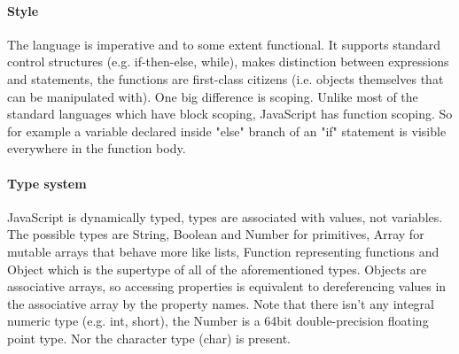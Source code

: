 \documentclass[12pt,a4paper]{report}
\begin{document}
\paragraph{Style} The language is imperative and to some extent functional. It supports standard control structures (e.g. if-then-else, while), makes distinction between expressions and statements, the functions are first-class citizens (i.e. objects themselves that can be manipulated with). One big difference is scoping. Unlike most of the standard languages which have block scoping, JavaScript has function scoping. So for example a variable declared inside "else" branch of an "if" statement is visible everywhere in the function body.

\paragraph{Type system} JavaScript is dynamically typed, types are associated with values, not variables. The possible types are String, Boolean and Number for primitives, Array for mutable arrays that behave more like lists, Function representing functions and Object which is the supertype of all of the aforementioned types. Objects are associative arrays, so accessing properties is equivalent to dereferencing values in the associative array by the property names. Note that there isn't any integral numeric type (e.g. int, short), the Number is a 64bit double-precision floating point type. Nor the character type (char) is present.
\end{document}
